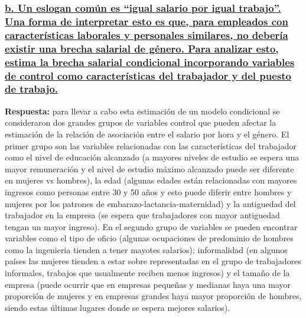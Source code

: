 \documentclass[
]{article}
\begin{document}
\subsubsection{\texorpdfstring{\ul{b. Un eslogan común es ``igual
salario por igual trabajo''. Una forma de interpretar esto es que, para
empleados con características laborales y personales similares, no
debería existir una brecha salarial de género. Para analizar esto,
estima la brecha salarial condicional incorporando variables de control
como características del trabajador y del puesto de
trabajo.}}{b. Un eslogan común es ``igual salario por igual trabajo''. Una forma de interpretar esto es que, para empleados con características laborales y personales similares, no debería existir una brecha salarial de género. Para analizar esto, estima la brecha salarial condicional incorporando variables de control como características del trabajador y del puesto de trabajo.}}\label{b.-un-eslogan-comuxfan-es-igual-salario-por-igual-trabajo.-una-forma-de-interpretar-esto-es-que-para-empleados-con-caracteruxedsticas-laborales-y-personales-similares-no-deberuxeda-existir-una-brecha-salarial-de-guxe9nero.-para-analizar-esto-estima-la-brecha-salarial-condicional-incorporando-variables-de-control-como-caracteruxedsticas-del-trabajador-y-del-puesto-de-trabajo.}

\textbf{Respuesta:} para llevar a cabo esta estimación de un modelo
condicional se consideraron dos grandes grupos de variables control que
pueden afectar la estimación de la relación de asociación entre el
salario por hora y el género. El primer grupo son las variables
relacionadas con las características del trabajador como el nivel de
educación alcanzado (a mayores niveles de estudio se espera una mayor
remuneración y el nivel de estudio máximo alcanzado puede ser diferente
en mujeres vs hombres), la edad (algunas edades están relacionadas con
mayores ingresos como personas entre 30 y 50 años y esto puede diferir
entre hombres y mujeres por los patrones de
embarazo-lactancia-maternidad) y la antiguedad del trabajador en la
empresa (se espera que trabajadores con mayor antiguedad tengan un mayor
ingreso). En el segundo grupo de variables se pueden encontrar variables
como el tipo de oficio (algunas ocupaciones de predominio de hombres
como la ingenieria tienden a tener mayotes salarios); informalidad (en
algunos países las mujeres tienden a estar sobre representadas en el
grupo de trabajadores informales, trabajos que usualmente reciben menos
ingresos) y el tamaño de la empresa (puede ocurrir que en empresas
pequeñas y medianas haya una mayor proporción de mujeres y en empresas
grandes haya mayor proporción de hombres, siendo estas últimas lugares
donde se espera mejores salarios).
\end{document}
